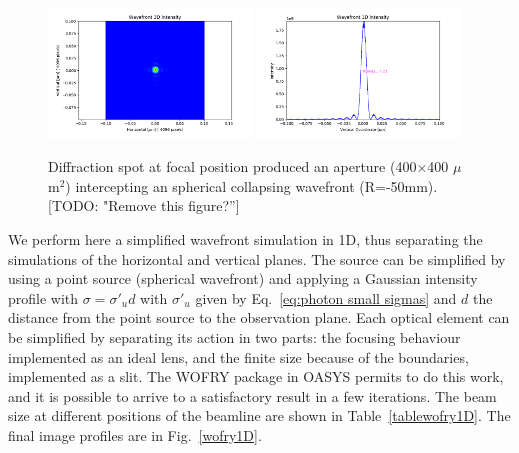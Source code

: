\documentclass{iucr}              %
\newcommand{\todo}[1]{{\color{red}[TODO: "#1'']}}
\begin{document}
\begin{figure}
\label{wofry400um}
\centering
\includegraphics[width=0.48\textwidth]{GRAPHICS/wofry400umslit.png}
\includegraphics[width=0.48\textwidth]{GRAPHICS/wofry400umprofile.png}
\caption{Diffraction spot at focal position produced an aperture (400$\times$400 $\mu$m$^2$) intercepting an spherical collapsing wavefront (R=-50mm).
\todo{Remove this figure?}}
\end{figure}

We perform here a simplified wavefront simulation in 1D, thus separating the simulations of the horizontal and vertical planes. The source can be simplified by using a point source (spherical wavefront) and applying a Gaussian intensity profile with $\sigma=\sigma'_u d$ with $\sigma'_u$ given by Eq.~\ref{eq:photon small sigmas} and $d$ the distance from the point source to the observation plane. Each optical element can be simplified by separating its action in two parts: the focusing behaviour implemented as an ideal lens, and the finite size because of the boundaries, implemented as a slit. The WOFRY package in OASYS permits to do this work, and it is possible to arrive to a satisfactory result in a few iterations. The beam size at different positions of the beamline are shown in Table~\ref{tablewofry1D}. The final image profiles are in Fig.~\ref{wofry1D}.
\end{document}
